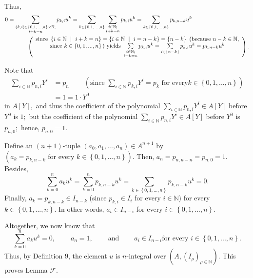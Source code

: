 \documentclass[12pt,final,notitlepage,onecolumn]{article}%
\begin{document}
Thus,%
\begin{align*}
0  &  =\sum\limits_{\substack{\left(  k,i\right)  \in\left\{
0,1,...,n\right\}  \times\mathbb{N};\\i+k=n}}p_{k,i}u^{k}=\sum\limits_{k\in
\left\{  0,1,...,n\right\}  }\sum_{\substack{i\in\mathbb{N};\\i+k=n}%
}p_{k,i}u^{k}=\sum\limits_{k\in\left\{  0,1,...,n\right\}  }p_{k,n-k}u^{k}\\
&  \ \ \ \ \ \ \ \ \ \ \left(
\begin{array}
[c]{c}%
\text{since }\left\{  i\in\mathbb{N}\text{\ }\mid\ i+k=n\right\}  =\left\{
i\in\mathbb{N}\ \mid\ i=n-k\right\}  =\left\{  n-k\right\}  \text{ (because
}n-k\in\mathbb{N}\text{,}\\
\text{since }k\in\left\{  0,1,...,n\right\}  \text{) yields }\sum
\limits_{\substack{i\in\mathbb{N};\\i+k=n}}p_{k,i}u^{k}=\sum\limits_{i\in
\left\{  n-k\right\}  }p_{k,i}u^{k}=p_{k,n-k}u^{k}%
\end{array}
\right)  .
\end{align*}


Note that%
\begin{align*}
\sum\limits_{i\in\mathbb{N}}p_{n,i}Y^{i}  &  =p_{n}\ \ \ \ \ \ \ \ \ \ \left(
\text{since }\sum\limits_{i\in\mathbb{N}}p_{k,i}Y^{i}=p_{k}\text{ for every
}k\in\left\{  0,1,...,n\right\}  \right) \\
&  =1=1\cdot Y^{0}%
\end{align*}
in $A\left[  Y\right]  ,$ and thus the coefficient of the polynomial
$\sum\limits_{i\in\mathbb{N}}p_{n,i}Y^{i}\in A\left[  Y\right]  $ before
$Y^{0}$ is $1;$ but the coefficient of the polynomial $\sum\limits_{i\in
\mathbb{N}}p_{n,i}Y^{i}\in A\left[  Y\right]  $ before $Y^{0}$ is $p_{n,0};$
hence, $p_{n,0}=1$.

Define an $\left(  n+1\right)  $-tuple $\left(  a_{0},a_{1},...,a_{n}\right)
\in A^{n+1}$ by $\left(  a_{k}=p_{k,n-k}\text{ for every }k\in\left\{
0,1,...,n\right\}  \right)  .$ Then, $a_{n}=p_{n,n-n}=p_{n,0}=1$. Besides,%
\[
\sum\limits_{k=0}^{n}a_{k}u^{k}=\sum\limits_{k=0}^{n}p_{k,n-k}u^{k}%
=\sum\limits_{k\in\left\{  0,1,...,n\right\}  }p_{k,n-k}u^{k}=0.
\]
Finally, $a_{k}=p_{k,n-k}\in I_{n-k}$ (since $p_{k,i}\in I_{i}$ for every
$i\in\mathbb{N}$) for every $k\in\left\{  0,1,...,n\right\}  $. In other
words, $a_{i}\in I_{n-i}$ for every $i\in\left\{  0,1,...,n\right\}  $.

Altogether, we now know that%
\[
\sum\limits_{k=0}^{n}a_{k}u^{k}=0,\ \ \ \ \ \ \ \ \ \ a_{n}%
=1,\ \ \ \ \ \ \ \ \ \ \text{and}\ \ \ \ \ \ \ \ \ \ a_{i}\in I_{n-i}\text{
for every }i\in\left\{  0,1,...,n\right\}  .
\]
Thus, by Definition 9, the element $u$ is $n$-integral over $\left(  A,\left(
I_{\rho}\right)  _{\rho\in\mathbb{N}}\right)  $. This proves Lemma
$\mathcal{F}$.
\end{document}
